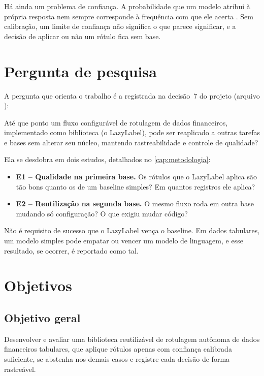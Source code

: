 Há ainda um problema de confiança. A probabilidade que um modelo atribui à própria resposta nem sempre corresponde à frequência com que ele acerta \cite{guo2017}. Sem calibração, um limite de confiança não significa o que parece significar, e a decisão de aplicar ou não um rótulo fica sem base.

\section{Pergunta de pesquisa}

A pergunta que orienta o trabalho é a registrada na decisão~7 do projeto (arquivo ):

\begin{citacao}
Até que ponto um fluxo configurável de rotulagem de dados financeiros, implementado como biblioteca (o LazyLabel), pode ser reaplicado a outras tarefas e bases sem alterar seu núcleo, mantendo rastreabilidade e controle de qualidade?
\end{citacao}

Ela se desdobra em dois estudos, detalhados no \autoref{cap:metodologia}:

\begin{itemize}
  \item \textbf{E1 -- Qualidade na primeira base.} Os rótulos que o LazyLabel aplica são tão bons quanto os de um baseline simples? Em quantos registros ele aplica?
  \item \textbf{E2 -- Reutilização na segunda base.} O mesmo fluxo roda em outra base mudando só configuração? O que exigiu mudar código?
\end{itemize}

Não é requisito de sucesso que o LazyLabel vença o baseline. Em dados tabulares, um modelo simples pode empatar ou vencer um modelo de linguagem, e esse resultado, se ocorrer, é reportado como tal.

\section{Objetivos}

\subsection{Objetivo geral}

Desenvolver e avaliar uma biblioteca reutilizável de rotulagem autônoma de dados financeiros tabulares, que aplique rótulos apenas com confiança calibrada suficiente, se abstenha nos demais casos e registre cada decisão de forma rastreável.

